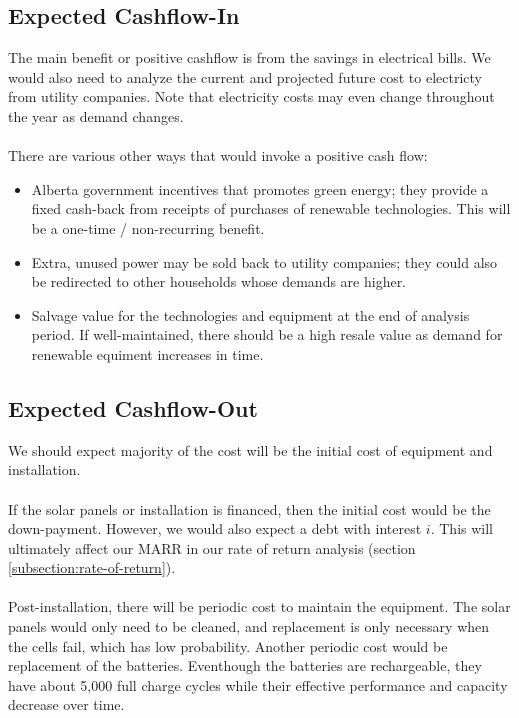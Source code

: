\documentclass[10pt,letterpaper]{article}
\begin{document}
\subsection{Expected Cashflow-In}
The main benefit or positive cashflow is from the savings in electrical bills. We would also need to analyze the current and projected future cost to electricty from utility companies. Note that electricity costs may even change throughout the year as demand changes.\\
\\
There are various other ways that would invoke a positive cash flow:\\

\begin{itemize}
	\item Alberta government incentives that promotes green energy; they provide a fixed cash-back from receipts of purchases of renewable technologies. This will be a one-time / non-recurring benefit.

	\item Extra, unused power may be sold back to utility companies; they could also be redirected to other households whose demands are higher.

	\item Salvage value for the technologies and equipment at the end of analysis period. If well-maintained, there should be a high resale value as demand for renewable equiment increases in time.
\end{itemize}

\subsection{Expected Cashflow-Out}\label{subsection:cashflow-out}

We should expect majority of the cost will be the initial cost of equipment and installation.\\
\\
If the solar panels or installation is financed, then the initial cost would be the down-payment. However, we would also expect a debt with interest $i$. This will ultimately affect our MARR in our rate of return analysis (section \ref{subsection:rate-of-return}).\\
\\
Post-installation, there will be periodic cost to maintain the equipment. The solar panels would only need to be cleaned, and replacement is only necessary when the cells fail, which has low probability. Another periodic cost would be replacement of the batteries. Eventhough the batteries are rechargeable, they have about 5,000 full charge cycles while their effective performance and capacity decrease over time\cite{tesla-powerwall-wiki}.\\
\end{document}

